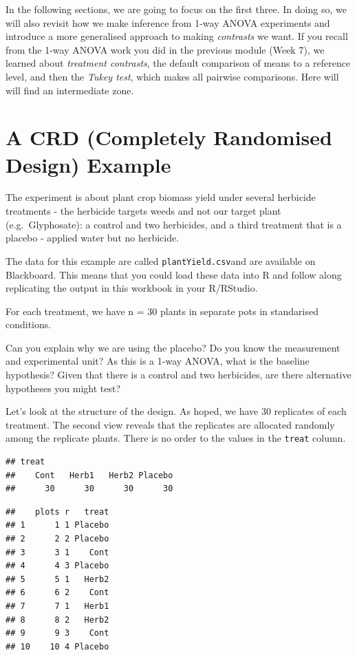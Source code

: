 \documentclass[
]{book}
\begin{document}
In the following sections, we are going to focus on the first three. In doing so, we will also revisit how we make inference from 1-way ANOVA experiments and introduce a more generalised approach to making \emph{contrasts} we want. If you recall from the 1-way ANOVA work you did in the previous module (Week 7), we learned about \emph{treatment contrasts}, the default comparison of means to a reference level, and then the \emph{Tukey test}, which makes all pairwise comparisons. Here will will find an intermediate zone.

\section{A CRD (Completely Randomised Design) Example}\label{a-crd-completely-randomised-design-example}

The experiment is about plant crop biomass yield under several herbicide treatments - the herbicide targets weeds and not our target plant (e.g.~Glyphosate): a control and two herbicides, and a third treatment that is a placebo - applied water but no herbicide.

The data for this example are called \texttt{plantYield.csv}and are available on Blackboard. This means that you could load these data into R and follow along replicating the output in this workbook in your R/RStudio.

For each treatment, we have n = 30 plants in separate pots in standarised conditions.

Can you explain why we are using the placebo? Do you know the measurement and experimental unit? As this is a 1-way ANOVA, what is the baseline hypothesis? Given that there is a control and two herbicides, are there alternative hypotheses you might test?

Let's look at the structure of the design. As hoped, we have 30 replicates of each treatment. The second view reveals that the replicates are allocated randomly among the replicate plants. There is no order to the values in the \texttt{treat} column.

\begin{verbatim}
## treat
##    Cont   Herb1   Herb2 Placebo 
##      30      30      30      30
\end{verbatim}

\begin{verbatim}
##    plots r   treat
## 1      1 1 Placebo
## 2      2 2 Placebo
## 3      3 1    Cont
## 4      4 3 Placebo
## 5      5 1   Herb2
## 6      6 2    Cont
## 7      7 1   Herb1
## 8      8 2   Herb2
## 9      9 3    Cont
## 10    10 4 Placebo
\end{verbatim}
\end{document}
